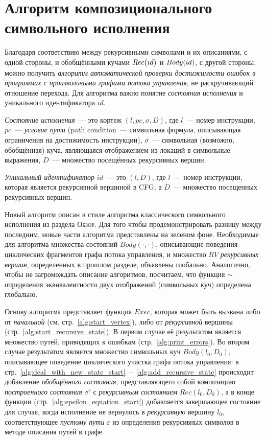 \section{Алгоритм композиционального символьного исполнения}

Благодаря соответствию между рекурсивными символами и их описаниями, с одной стороны, и обобщёнными кучами $Rec\big(id\big)$ и $Body{}(id)$, с другой стороны, можно 
получить \emph{алгоритм автоматической проверки достижимости ошибок в программах с произвольными графами потока управления}, не раскручивающий отношение перехода. Для алгоритма важно понятие \emph{состояния исполнения} и уникального идентификатора $id$.

\begin{defn}
\emph{Состояние исполнения}~--- это кортеж $(l,pc,\sigma,D)$, где $l$~--- номер инструкции,
$pc$~--- \emph{условие пути} (\foreignlanguage{english}{path condition}~--- символьная формула, описывающая ограничения на достижимость инструкции), $\sigma$~--- символьная (возможно, обобщённая) куча, являющаяся отображением из локаций в символьные выражения, $D$~--- множество посещённых рекурсивных вершин.

\emph{Уникальный идентификатор $id$}~--- это $(l,D)$, где $l$~--- номер инструкции, которая является рекурсивной вершиной в CFG, а $D$~--- множество посещенных рекурсивных вершин.
\end{defn}

Новый алгоритм описан в стиле алгоритма классического символьного исполнения из раздела \textsc{Обзор}. Для того чтобы продемонстрировать разницу между последним, новые части алгоритма представлены на зеленом фоне. Необходимые для алгоритма множества состояний $Body(\cdot,\cdot)$, описывающие поведения циклических фрагментов графа потока управления, и множество $RV$ \emph{рекурсивных вершин}, определенных в прошлом разделе, объявлены глобально. Аналогично, чтобы не загромождать описание алгоритмов, посчитаем, что функция $\sim$ определения эквивалентности двух отображений (символьных куч) определена глобально.

Основу алгоритма представляет функция $Exec$, которая может быть вызвана либо от \emph{начальной} (см. стр.~\ref{alg:start_vertex}), 
либо от \emph{рекурсивной} вершины (стр.~\ref{alg:start_recursive_state}). В первом случае её результатом является  множество путей, приводящих к ошибкам (стр.~\ref{alg:print_errors}).
Во втором случае результатом является множество символьных куч $Body(l_0,D_0)$, описывающее поведение циклического участка графа потока управления:
в стр.~\ref{alg:deal_with_new_state_start}~--~\ref{alg:add_recursive_state} 
происходит добавление \emph{обобщённого состояния}, представляющего собой композицию \emph{построенного состояния} $\sigma'$ с \emph{рекурсивным состоянием} $Rec(l_0,D_0)$, 
а в конце функции (стр.~\ref{alg:epsilon_equation_start}) добавляется завершающее состояние для случая, 
когда исполнение не вернулось в \emph{рекурсивную} вершину $l_0$,
соответствующее \emph{пустому пути} $\varepsilon$ из определения рекурсивных символов в методе описания путей в графе.


